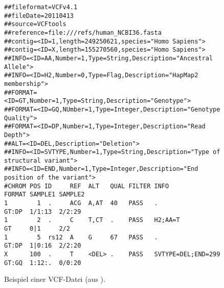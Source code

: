 \begin{figure}[htbp]
    \begin{center}
    \begin{footnotesize}
\begin{BVerbatim}
##fileformat=VCFv4.1
##fileDate=20110413
##source=VCFtools
##reference=file:///refs/human_NCBI36.fasta
##contig=<ID=1,length=249250621,species="Homo Sapiens">
##contig=<ID=X,length=155270560,species="Homo Sapiens">
##INFO=<ID=AA,Number=1,Type=String,Description="Ancestral Allele">
##INFO=<ID=H2,Number=0,Type=Flag,Description="HapMap2 membership">
##FORMAT=<ID=GT,Number=1,Type=String,Description="Genotype">
##FORMAT=<ID=GQ,NUmber=1,Type=Integer,Description="Genotype Quality">
##FORMAT=<ID=DP,Number=1,Type=Integer,Description="Read Depth">
##ALT=<ID=DEL,Description="Deletion">
##INFO=<ID=SVTYPE,Number=1,Type=String,Description="Type of structural variant">
##INFO=<ID=END,Number=1,Type=Integer,Description="End position of the variant">
#CHROM POS ID     REF  ALT   QUAL FILTER INFO               FORMAT SAMPLE1 SAMPLE2
1        1  .     ACG  A,AT  40   PASS   .                  GT:DP  1/1:13  2/2:29
1        2  .     C    T,CT  .    PASS   H2;AA=T            GT     0|1     2/2
1        5  rs12  A    G     67   PASS   .                  GT:DP  1|0:16  2/2:20
X      100  .     T    <DEL> .    PASS   SVTYPE=DEL;END=299 GT:GQ  1:12:.  0/0:20
\end{BVerbatim}
        \end{footnotesize}
    \end{center}
    \caption{Beispiel einer VCF-Datei (aus \citep{Danecek2011}).}
    \label{fig:data:vcf:example}
\end{figure}
